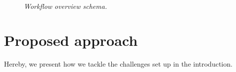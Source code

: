 \begin{figure}
	\begin{center}
		\caption{\textit{Workflow overview schema.}}
		\label{fig:1}
	\end{center}
	\vspace{-25pt}
\end{figure}
\section{Proposed approach}
Hereby, we present how we tackle the challenges set up in the introduction.
